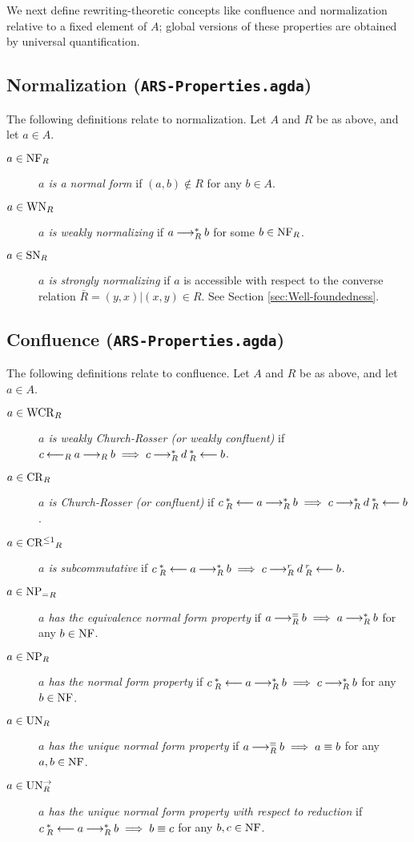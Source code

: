 We next define rewriting-theoretic concepts like confluence and normalization relative to a fixed element of $A$; global versions of these properties are obtained by universal quantification.
\subsection{Normalization (\texttt{ARS-Properties.agda})}
\begin{definition} The following definitions relate to normalization. Let $A$ and $R$ be as above, and let $a \in A$.
  \begin{description}
    \item[$a \in \mathrm{NF}_R$] \emph{$a$ is a normal form} if $(a,b) \notin R$ for any $b \in A$.
    \item[$a \in \mathrm{WN}_R$] \emph{$a$ is weakly normalizing} if $a \mathbin{\longrightarrow_R^*} b$ for some $b \in \mathrm{NF}_R$.
    \item[$a \in \mathrm{SN}_R$] \emph{$a$ is strongly normalizing} if $a$ is accessible with respect to the converse relation $\bar{R} = {(y,x) | (x,y) \in R}$. See Section \ref{sec:Well-foundedness}.
  \end{description}
\end{definition}



\subsection{Confluence (\texttt{ARS-Properties.agda})}
\begin{definition} The following definitions relate to confluence. Let $A$ and $R$ be as above, and let $a \in A$.
    \begin{description}
        \item[$a \in \mathrm{WCR}_R$] \emph{$a$ is weakly Church-Rosser (or weakly confluent)} if $c \mathbin{\longleftarrow_R} a \mathbin{\longrightarrow_R} b \implies c \mathbin{\longrightarrow_R^*} d \mathbin{_R^*\longleftarrow} b$.
        \item[$a \in \mathrm{CR}_R$] \emph{$a$ is Church-Rosser (or confluent)} if $c \mathbin{_R^*\longleftarrow} a \mathbin{\longrightarrow_R^*} b \implies c \mathbin{\longrightarrow_R^*} d \mathbin{_R^*\longleftarrow} b$.
        \item[$a \in \mathrm{CR^{\le 1}}_R$] \emph{$a$ is subcommutative} if $c \mathbin{_R^*\longleftarrow} a \mathbin{\longrightarrow_R^*} b \implies c \mathbin{\longrightarrow_R^r} d \mathbin{_R^r\longleftarrow} b$.
        \item[$a \in \mathrm{NP_=}_R$] \emph{$a$ has the equivalence normal form property} if $a \mathbin{\longrightarrow_R^=} b \implies a\mathbin{\longrightarrow_R^*} b$ for any $b \in \mathrm{NF}$.
        \item[$a \in \mathrm{NP}_R$] \emph{$a$ has the normal form property} if $c \mathbin{_R^*\longleftarrow} a \mathbin{\longrightarrow_R^*} b \implies c \mathbin{\longrightarrow_R^*} b$ for any $b \in \mathrm{NF}$.
        \item[$a \in \mathrm{UN}_R$] \emph{$a$ has the unique normal form property} if $a \mathbin{\longrightarrow_R^=} b \implies a \equiv b$  for any $a, b \in \mathrm{NF}$.
        \item[$a \in \mathrm{UN}^{\to}_R$] \emph{$a$ has the unique normal form property with respect to reduction} if $c \mathbin{_R^*\longleftarrow} a \mathbin{\longrightarrow_R^*} b  \implies b \equiv c$  for any $b, c \in \mathrm{NF}$.
    \end{description}
\end{definition}

